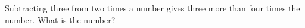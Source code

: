 Subtracting three from two times a number gives three more than four times the number. What is the number?
